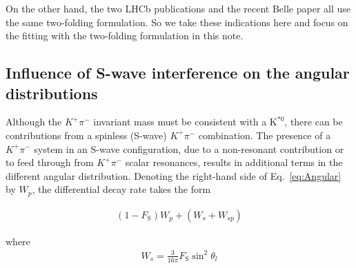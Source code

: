 On the other hand, the two LHCb publications and the recent Belle
paper all use the same two-folding formulation. So we take these
indications here and focus on the fitting with the two-folding
formulation in this note.




\subsection{Influence of S-wave interference on the angular distributions}
\label{sec:S-waveform}
Although the $K^+\pi^-$ invariant mass must be consistent with a
$\text{K}^{*0}$, there can be contributions from a spinless (S-wave)
$K^+\pi^-$ combination. The presence of a $K^+\pi^-$
system in an S-wave configuration, due to a non-resonant contribution or
to feed through from $K^+\pi^-$ scalar resonances, results in additional
terms in the different angular distribution. Denoting the right-hand side
 of Eq.~\ref{eq:Angular} by $W_p$, the differential decay rate takes the form

\begin{equation} \label{eq:S-wave}
    \begin{split}
    (1-F_\mathrm{S})W_p + (W_s + W_{sp})
    \end{split}
\end{equation}

where 
\begin{equation} \label{eq:S-wave0}
    \begin{split}
      W_s = \frac{3}{16\pi} F_\mathrm{S}\sin^2\theta_l
    \end{split}
\end{equation}

